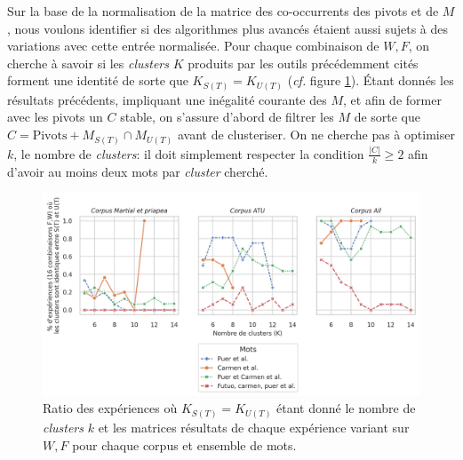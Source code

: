Sur la base de la normalisation de la matrice des co-occurrents des pivots et de $M$, nous voulons identifier si des algorithmes plus avancés étaient aussi sujets à des variations avec cette entrée normalisée. Pour chaque combinaison de $W,F$, on cherche à savoir si les \textit{clusters} $K$ produits par les outils précédemment cités forment une identité de sorte que $K_{S(T)} = K_{U(T)}$ (\textit{cf.} figure \ref{fig:chap1:noise:clusters_rates}). Étant donnés les résultats précédents, impliquant une inégalité courante des $M$, et afin de former avec les pivots un $C$ stable, on s'assure d'abord de filtrer les $M$ de sorte que $C = \text{Pivots} + M_{S(T)} \cap M_{U(T)}$ avant de clusteriser. On ne cherche pas à optimiser $k$, le nombre de \textit{clusters}: il doit simplement respecter la condition $\frac{\left | C \right |}{k} \geq 2$ afin d'avoir au moins deux mots par \textit{cluster} cherché.

\begin{figure}[ht]
    \centering
    \includegraphics[width=1\linewidth]{figures/chap1/part2/cluster_binary_rates.png}
    \caption{Ratio des expériences où $K_{S(T)} = K_{U(T)}$ étant donné le nombre de \textit{clusters} $k$ et les matrices résultats de chaque expérience variant sur $W,F$ pour chaque corpus et ensemble de mots.}
    \label{fig:chap1:noise:clusters_rates}
\end{figure}


